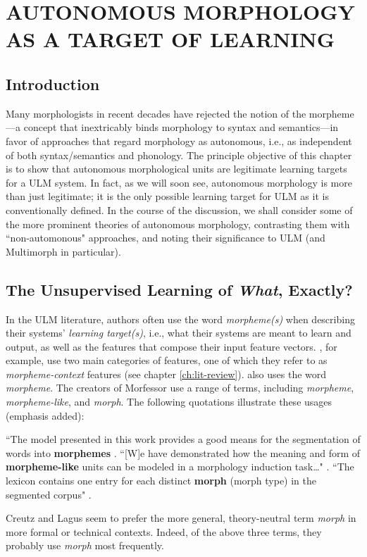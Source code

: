 \chapter{AUTONOMOUS MORPHOLOGY AS A TARGET OF LEARNING}
\label{autonomous}

\section{Introduction}
Many morphologists in recent decades have rejected the notion of the morpheme---a concept that inextricably binds morphology to syntax and semantics---in favor of approaches that regard morphology as autonomous, i.e., as independent 
of both syntax/semantics and phonology. The principle objective of this chapter is to 
show that autonomous morphological units are legitimate learning targets for a \ac{ULM}  system. In fact, as we will soon see, autonomous morphology is more than just legitimate; it is the only possible learning target for \ac{ULM}  as it is conventionally defined.
In the course of the discussion, we shall consider some of the more prominent theories of autonomous morphology, contrasting them with ``non-automonous" approaches, and  noting their significance to \ac{ULM} (and Multimorph in particular).


\section{The Unsupervised Learning of \textit{What}, Exactly?}
\label{sec:what-exactly}
In the \ac{ULM} literature, authors often use the word \emph{morpheme(s)} 
when describing their systems' \emph{learning target(s)}, i.e., what their systems are meant to learn and 
output, as well as the features that compose their input feature vectors.
\cite{poon-et-al:2009}, for example, use two main categories 
of features, one of which they refer to as \emph{morpheme-context} features (see chapter \ref{ch:lit-review}).
\cite{goldsmith:2001, goldsmith:2006} also uses the word 
\emph{morpheme}.
The creators of Morfessor 
\citep{creutz-and-lagus:2002, 
creutz-and-lagus:2005, creutz-and-lagus:2007}
use a range of terms, including 
\emph{morpheme},
\emph{morpheme-like}, and \emph{morph}. The following quotations 
illustrate these usages (emphasis added):
\begin{exe}
\ex ``The model presented in this 
work provides a good means for the segmentation of words into 
\textbf{morphemes} \citep[][p. 6]{creutz-and-lagus:2007}. 
\ex``[W]e have demonstrated how the meaning and form of 
\textbf{morpheme-like} units can be modeled in a 
morphology induction task\dots" \citep{creutz-and-lagus:2005}.
\ex``The lexicon contains one entry for each distinct \textbf{morph} 
(morph type) in the 
segmented corpus" \citep[][p. 9]{creutz-and-lagus:2007}. 
\end{exe}
Creutz and Lagus seem to prefer the more general, theory-neutral term \emph{morph} 
in more formal or technical contexts. Indeed,
of the above three terms, they probably use 
\emph{morph} most frequently.

